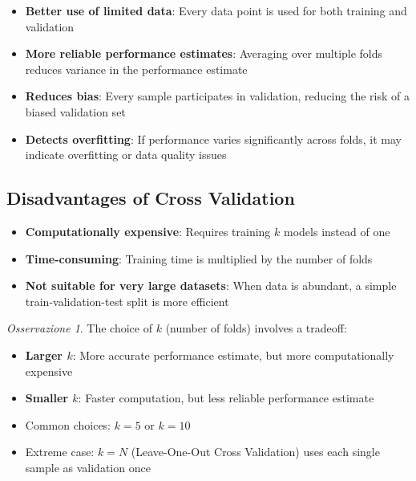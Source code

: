 \documentclass[11pt,a4paper]{article}
\theoremstyle{definition}
\theoremstyle{plain}
\theoremstyle{remark}
\newtheorem*{observation}{Osservazione}
\begin{document}
\begin{itemize}
    \item \textbf{Better use of limited data}: Every data point is used for both training and validation
    
    \item \textbf{More reliable performance estimates}: Averaging over multiple folds reduces variance in the performance estimate
    
    \item \textbf{Reduces bias}: Every sample participates in validation, reducing the risk of a biased validation set
    
    \item \textbf{Detects overfitting}: If performance varies significantly across folds, it may indicate overfitting or data quality issues
\end{itemize}

\subsection{Disadvantages of Cross Validation}

\begin{itemize}
    \item \textbf{Computationally expensive}: Requires training $k$ models instead of one
    
    \item \textbf{Time-consuming}: Training time is multiplied by the number of folds
    
    \item \textbf{Not suitable for very large datasets}: When data is abundant, a simple train-validation-test split is more efficient
\end{itemize}

\begin{observation}
The choice of $k$ (number of folds) involves a tradeoff:
\begin{itemize}
    \item \textbf{Larger $k$}: More accurate performance estimate, but more computationally expensive
    \item \textbf{Smaller $k$}: Faster computation, but less reliable performance estimate
    \item Common choices: $k = 5$ or $k = 10$
    \item Extreme case: $k = N$ (Leave-One-Out Cross Validation) uses each single sample as validation once
\end{itemize}
\end{observation}
\end{document}
